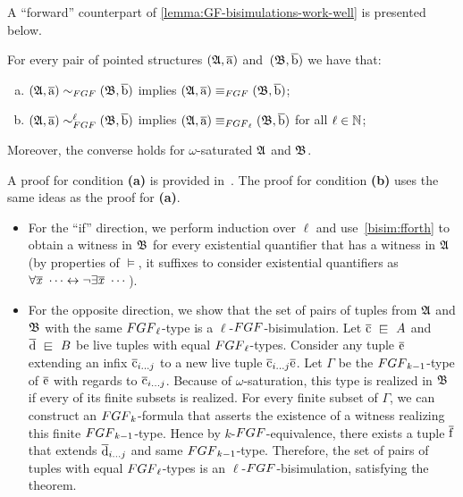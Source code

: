 A ``forward'' counterpart of \cref{lemma:GF-bisimulations-work-well} is presented below.
\begin{lemma}\label{lem:FGF-bisimulations-work-well}
For every pair of pointed structures $({\mathfrak{A}}, \overline{\mathrm{a}})$ and~$({\mathfrak{B}}, \overline{\mathrm{b}})$ we have that:
\begin{enumerate}[(a)]
\item $(\str{A}, \elemtuplea) \bisimto_{\FGF} (\str{B}, \elemtupleb)$ implies $(\str{A}, \elemtuplea) \equiv_{\FGF} (\str{B}, \elemtupleb)$;
\item $(\str{A}, \elemtuplea) \bisimto_{\FGF}^{\ell} (\str{B}, \elemtupleb)$ implies $(\str{A}, \elemtuplea) \equiv_{\FGF_\ell} (\str{B}, \elemtupleb)$ for all $\ell \in {\mathbb{N}}$;
\end{enumerate}
Moreover, the converse holds for $\omega$-saturated ${\mathfrak{A}}$ and ${\mathfrak{B}}$.
\end{lemma}
\begin{proofsketch}
  A proof for condition \textbf{(a)} is provided in~\cite[Lemma 3]{BednarczykJ22}.
  The proof for condition \textbf{(b)} uses the same ideas as the proof for \textbf{(a)}.
  \begin{itemize}
    \item
          For the ``if'' direction, we perform induction over $\ell$ and use~\ref{bisim:fforth} to obtain a witness in ${\mathfrak{B}}$ for every existential quantifier that has a witness in ${\mathfrak{A}}$ (by properties of $\models$, it suffixes to consider existential quantifiers as $\forall\overline{\mathit{x}}\ \cdots \leftrightarrow \lnot \exists \overline{\mathit{x}}\ \cdots$).
    \item
          For the opposite direction, we show that the set of pairs of tuples from ${\mathfrak{A}}$ and ${\mathfrak{B}}$ with the same $\FGF_{\ell}$-type is a $\ell$-$\FGF$-bisimulation.
          Let $\elemtuplec \sqin A$ and $\elemtupled \sqin B$ be live tuples with equal $\FGF_{\ell}$-types.
          Consider any tuple $\overline{\mathrm{e}}$ extending an infix $\overline{\mathrm{c}}_{i\ldots j}$ to a new live tuple $\overline{\mathrm{c}}_{i\ldots j}\overline{\mathrm{e}}$.
          Let $\Gamma$ be the $\FGF_{k-1}$-type of $\overline{\mathrm{e}}$ with regards to $\overline{\mathrm{c}}_{i\ldots j}$.
          Because of $\omega$-saturation, this type is realized in ${\mathfrak{B}}$ if every of its finite subsets is realized.
          For every finite subset of $\Gamma$, we can construct an $\FGF_{k}$-formula that asserts the existence of a witness realizing this finite $\FGF_{k-1}$-type.
          Hence by $k$-$\FGF$-equivalence, there exists a tuple $\overline{\mathrm{f}}$ that extends $\overline{\mathrm{d}}_{i\ldots j}$ and same $\FGF_{k-1}$-type.
          Therefore, the set of pairs of tuples with equal $\FGF_{\ell}$-types is an $\ell$-$\FGF$-bisimulation, satisfying the theorem.
  \end{itemize}
\end{proofsketch}


